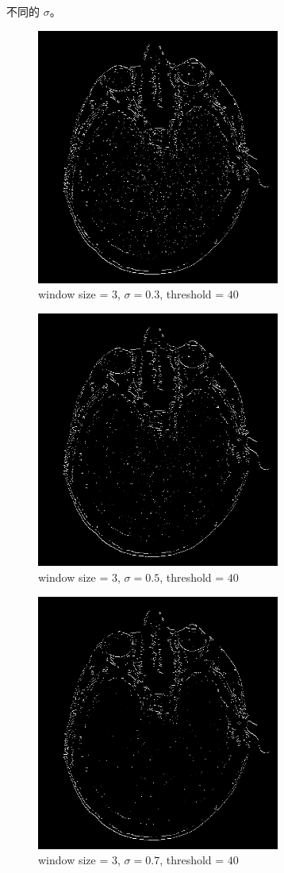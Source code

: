 \documentclass[conference]{IEEEtran}
\begin{document}
不同的 $\sigma$。

\begin{figure}[H]
\centerline{\includegraphics[width=8cm]{headCT04.png}}
\caption{window size = $3$, $\sigma=0.3$,  threshold = $40$}
\label{headCT04}
\end{figure}

\begin{figure}[H]
\centerline{\includegraphics[width=8cm]{headCT05.png}}
\caption{window size = $3$, $\sigma=0.5$,  threshold = $40$}
\label{headCT05}
\end{figure}

\begin{figure}[H]
\centerline{\includegraphics[width=8cm]{headCT06.png}}
\caption{window size = $3$, $\sigma=0.7$,  threshold = $40$}
\label{headCT06}
\end{figure}
\end{document}
